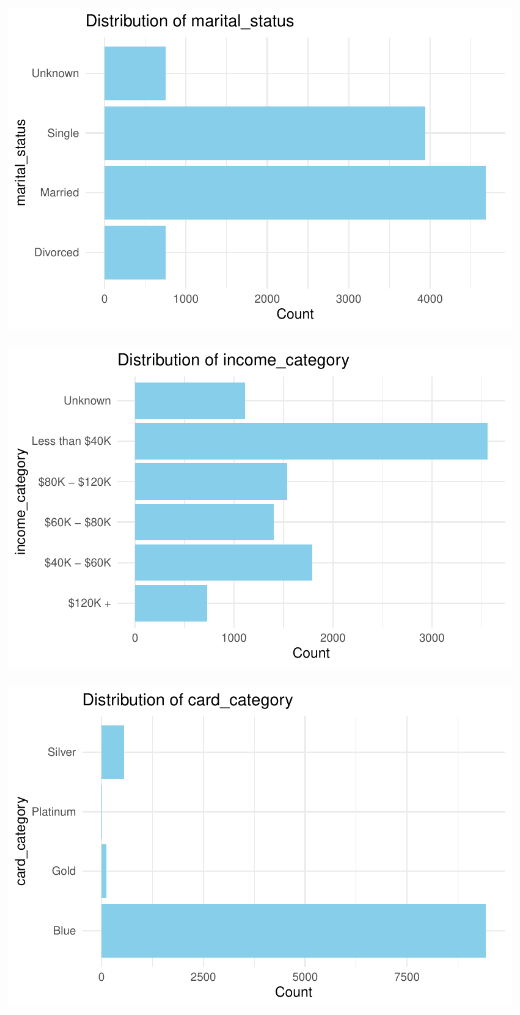 \documentclass[
  letterpaper,
  DIV=11,
  numbers=noendperiod]{scrartcl}
\begin{document}
\includegraphics{Tackling-Attrition-at-Tifosi-Bank_files/figure-pdf/unnamed-chunk-8-4.pdf}

\includegraphics{Tackling-Attrition-at-Tifosi-Bank_files/figure-pdf/unnamed-chunk-8-5.pdf}

\includegraphics{Tackling-Attrition-at-Tifosi-Bank_files/figure-pdf/unnamed-chunk-8-6.pdf}
\end{document}
